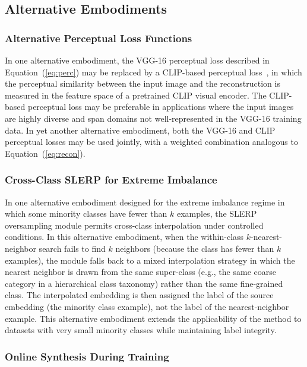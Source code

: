 \documentclass[12pt,letterpaper]{article}
\begin{document}
\subsection{Alternative Embodiments}

\subsubsection{Alternative Perceptual Loss Functions}

In one alternative embodiment, the VGG-16 perceptual loss described in
Equation~(\ref{eq:perc}) may be replaced by a CLIP-based perceptual
loss~\cite{radford2021}, in which the perceptual similarity between the input
image and the reconstruction is measured in the feature space of a pretrained
CLIP visual encoder. The CLIP-based perceptual loss may be preferable in
applications where the input images are highly diverse and span domains not
well-represented in the VGG-16 training data. In yet another alternative
embodiment, both the VGG-16 and CLIP perceptual losses may be used jointly,
with a weighted combination analogous to Equation~(\ref{eq:recon}).

\subsubsection{Cross-Class SLERP for Extreme Imbalance}

In one alternative embodiment designed for the extreme imbalance regime in which
some minority classes have fewer than $k$ examples, the SLERP oversampling
module permits cross-class interpolation under controlled conditions. In this
alternative embodiment, when the within-class $k$-nearest-neighbor search fails
to find $k$ neighbors (because the class has fewer than $k$ examples), the
module falls back to a mixed interpolation strategy in which the nearest
neighbor is drawn from the same super-class (e.g., the same coarse category in
a hierarchical class taxonomy) rather than the same fine-grained class. The
interpolated embedding is then assigned the label of the source embedding
(the minority class example), not the label of the nearest-neighbor example.
This alternative embodiment extends the applicability of the method to datasets
with very small minority classes while maintaining label integrity.

\subsubsection{Online Synthesis During Training}
\end{document}
